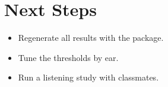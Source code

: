\documentclass[11pt,a4paper]{article}
\begin{document}
\section{Next Steps}
\begin{itemize}
  \item Regenerate all results with the package.
  \item Tune the thresholds by ear.
  \item Run a listening study with classmates.
\end{itemize}
\end{document}
